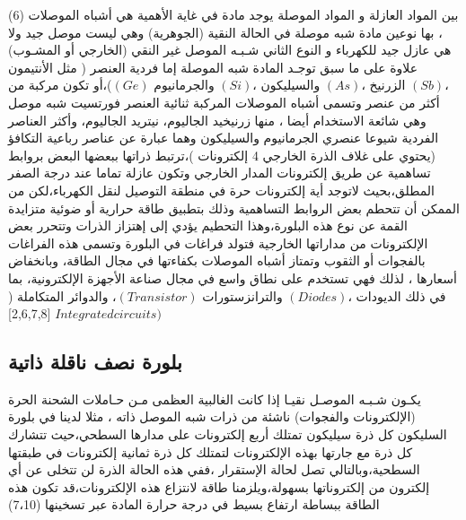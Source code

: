 	
	بين المواد العازلة و المواد الموصلة يوجد مادة في غاية الأهمية هي أشباه الموصلات (6) ، بها نوعين مادة شبه موصلة في الحالة النقية (الجوهرية) وهي ليست موصل جيد ولا هي عازل جيد للكهرباء و النوع الثاني شـبـه الموصل غير النقي (الخارجي أو المشـوب) علاوة على ما سبق توجـد المادة شبه الموصلة إما فردية العنصر ( مثل  الأنتيمون $ ( Sb)، $ الزرنيخ $ ( As )، $ والسيليكون $ (Si)، $ والجرمانيوم  $ (G e) $)،أو تكون مركبة من أكثر من عنصر وتسمى أشباه الموصلات المركبة ثنائية العنصر فورتسیت شبه موصل وهي شائعة الاستخدام أيضا ، منها زرنيخيد الجاليوم، نيتريد الجاليوم، وأكثر العناصر الفردية شيوعا عنصري الجرمانيوم والسيليكون وهما عبارة عن عناصر رباعية التكافؤ (يحتوي على غلاف الذرة الخارجي 4 إلكترونات )‬،ترتبط ذراتها ببعضها البعض بروابط تساهمية عن طريق إلكترونات المدار الخارجي وتكون عازلة تماما عند درجة الصفر المطلق،بحيث لاتوجد أية إلكترونات حرة في منطقة التوصيل لنقل الكهرباء،‫لكن من الممكن أن تتحطم بعض الروابط التساهمية وذلك بتطبيق طاقة حرارية أو ضوئية متزايدة القمة عن نوع هذه البلورة،وهذا التحطيم يؤدي إلى إهتزاز الذرات وتتحرر بعض الإلكترونات من مداراتها الخارجية فتولد فراغات في البلورة وتسمى هذه الفراغات بالفجوات أو الثقوب  وتمتاز أشباه الموصلات بكفاءتها في مجال الطاقة، وبانخفاض أسعارها ، لذلك فهي تستخدم على نطاق واسع في مجال صناعة الأجهزة الإلكترونية، بما في ذلك الديودات  $ (Diodes)، $ والترانزستورات $ (Transistor )$، والدوائر المتكاملة 
	($ Integrated circuits)   $
	[2,6,7,8]
	
	\subsection{ بلورة نصف ناقلة ذاتية}
	يكـون شـبـه الموصـل نقيـا إذا كانت الغالبية العظمى مـن حـاملات الشحنة الحرة (الإلكترونات والفجوات) ناشئة من ذرات شبه الموصل ذاته ، مثلا لدينا في بلورة السليكون كل ذرة سيليكون تمتلك أربع إلكترونات على مدارها السطحي،حيث تتشارك كل ذرة مع جارتها بهذه الإلكترونات لتمتلك كل ذرة ثمانية إلكترونات في طبقتها السطحية،وبالتالي تصل لحالة الإستقرار ،ففي هذه الحالة الذرة لن تتخلى عن أي إلكترون من إلكتروناتها بسهولة،ويلزمنا طاقة لانتزاع هذه الإلكترونات،قد تكون هذه الطاقة ببساطة ارتفاع بسيط في درجة حرارة المادة عبر تسخينها (7،10)
	
	
